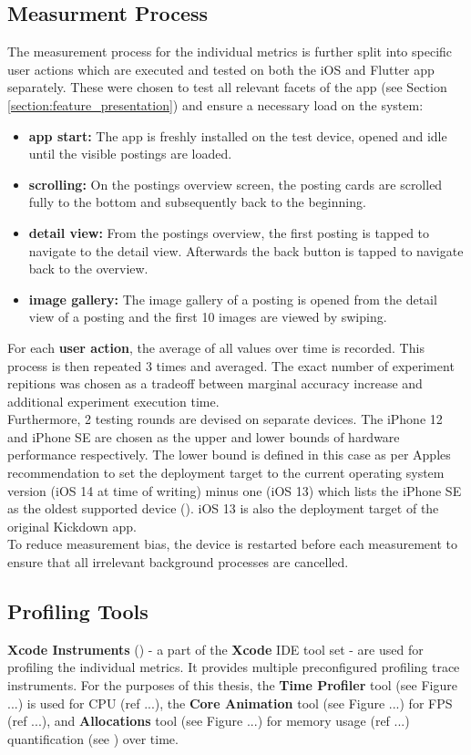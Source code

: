 \subsection{Measurment Process} \label{subsection::measurement_process}
The measurement process for the individual metrics is further split into specific user actions
which are executed and tested on both the iOS and Flutter app separately. These were chosen
to test all relevant facets of the app (see Section \ref{section:feature_presentation}) and ensure a necessary load on the system:
\begin{itemize}
    \item \textbf{app start:} The app is freshly installed on the test device, opened and idle until the visible postings are loaded.
    \item \textbf{scrolling:} On the postings overview screen, the posting cards are scrolled fully to the bottom and subsequently back to the beginning.
    \item \textbf{detail view:} From the postings overview, the first posting is tapped to navigate to the detail view. Afterwards the back button is tapped to navigate back to the overview.
    \item \textbf{image gallery:} The image gallery of a posting is opened from the detail view of a posting and the first 10 images are viewed by swiping.
\end{itemize}
For each \textbf{user action}, the average of all values over time is recorded. This process is then
repeated 3 times and averaged. The exact number of experiment repitions was chosen as a
tradeoff between marginal accuracy increase and additional experiment execution time.\\
Furthermore, 2 testing rounds are devised on separate devices. The iPhone 12 and iPhone
SE are chosen as the upper and lower bounds of hardware performance respectively. The lower
bound is defined in this case as per Apples recommendation to set the deployment target to the
current operating system version (iOS 14 at time of writing) minus one (iOS 13) which lists the
iPhone SE as the oldest supported device (\cite{Apple2021}). iOS 13 is also the deployment
target of the original Kickdown app.\\
To reduce measurement bias, the device is restarted before each measurement to ensure that all
irrelevant background processes are cancelled.

\subsection{Profiling Tools} \label{subsection::profiling_tooling}
\textbf{Xcode Instruments} (\cite{Apple2019}) - a part of the \textbf{Xcode} IDE tool set - are used for profiling the individual metrics. It provides multiple preconfigured
profiling trace instruments.
For the purposes of this thesis, the \textbf{Time Profiler} tool (see Figure ...) is used for CPU (ref ...), the \textbf{Core Animation} tool (see Figure ...) for FPS (ref ...), and 
\textbf{Allocations} tool (see Figure ...) for memory usage (ref ...) quantification (see ) over time.



